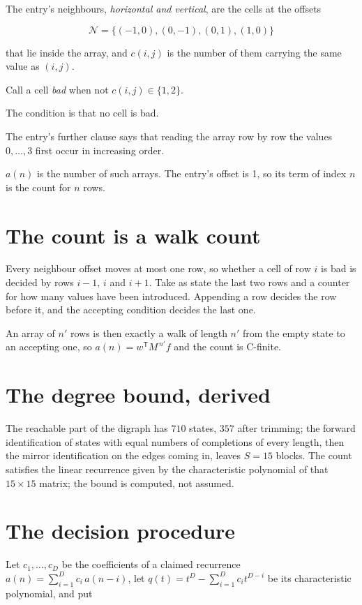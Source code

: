 \documentclass[11pt]{article}
\theoremstyle{definition}
\begin{document}
The entry's neighbours, {\itshape horizontal and vertical}, are the cells at the offsets

\[\mathcal{N} = \{(-1,0), (0,-1), (0,1), (1,0)\}\]

that lie inside the array, and $c(i,j)$ is the number of them carrying the same value as $(i,j)$.

Call a cell {\itshape bad} when not $c(i,j) \in \{1, 2\}$.

The condition is that no cell is bad.

The entry's further clause says that reading the array row by row the values $0,\dots,3$ first occur in increasing order.

$a(n)$ is the number of such arrays. The entry's offset is 1, so its term of index $n$ is the count for $n$ rows.

\section{The count is a walk count}

Every neighbour offset moves at most one row, so whether a cell of row $i$ is bad is decided by rows $i-1$, $i$ and $i+1$. Take as state the last two rows and a counter for how many values have been introduced. Appending a row decides the row before it, and the accepting condition decides the last one.

An array of $n'$ rows is then exactly a walk of length $n'$ from the empty state to an accepting one, so $a(n) = w^{\mathsf T}M^{\,n'}f$ and the count is C-finite.

\section{The degree bound, derived}

The reachable part of the digraph has $710$ states, $357$ after trimming; the forward identification of states with equal numbers of completions of every length, then the mirror identification on the edges coming in, leaves $S = 15$ blocks. The count satisfies the linear recurrence given by the characteristic polynomial of that $15\times15$ matrix; the bound is computed, not assumed.

\section{The decision procedure}

Let $c_1,\dots,c_D$ be the coefficients of a claimed recurrence $a(n) = \sum_{i=1}^{D} c_i\,a(n-i)$, let $q(t) = t^{D} - \sum_{i=1}^{D} c_i t^{D-i}$ be its characteristic polynomial, and put
\end{document}
